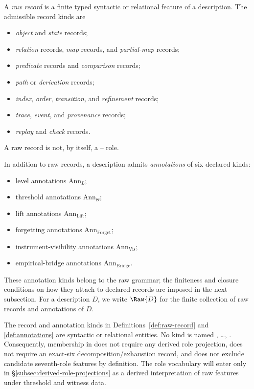 \begin{definition}\label{def:raw-record}
A \emph{raw record} is a finite typed syntactic or relational feature of a
description. The admissible record kinds are
\begin{itemize}[topsep=2pt,itemsep=1pt]
  \item \emph{object} and \emph{state} records;
  \item \emph{relation} records, \emph{map} records, and \emph{partial-map}
    records;
  \item \emph{predicate} records and \emph{comparison} records;
  \item \emph{path} or \emph{derivation} records;
  \item \emph{index}, \emph{order}, \emph{transition}, and \emph{refinement}
    records;
  \item \emph{trace}, \emph{event}, and \emph{provenance} records;
  \item \emph{replay} and \emph{check} records.
\end{itemize}
A raw record is not, by itself, a \Pone{}--\Psix{} role.
\end{definition}

\begin{definition}[Annotations]\label{def:annotations}
In addition to raw records, a description admits \emph{annotations} of six
declared kinds:
\begin{itemize}[topsep=2pt,itemsep=1pt]
  \item level annotations \(\mathrm{Ann}_L\);
  \item threshold annotations \(\mathrm{Ann}_\Theta\);
  \item lift annotations \(\mathrm{Ann}_{\mathrm{Lift}}\);
  \item forgetting annotations \(\mathrm{Ann}_{\mathrm{Forget}}\);
  \item instrument-visibility annotations \(\mathrm{Ann}_{\mathrm{Vis}}\);
  \item empirical-bridge annotations \(\mathrm{Ann}_{\mathrm{Bridge}}\).
\end{itemize}
These annotation kinds belong to the raw grammar; the finiteness and closure
conditions on how they attach to declared records are imposed in the next
subsection. For a description \(D\), we write \(\Raw{D}\) for the finite
collection of raw records and annotations of \(D\).
\end{definition}

\begin{remark}\label{rem:alphabet-independence}
The record and annotation kinds in Definitions~\ref{def:raw-record} and
\ref{def:annotations} are syntactic or relational entities. No kind is named
\Pone{}, \ldots, \Psix{}. Consequently, membership in \FATCD{} does not
require any derived role projection, does not require an exact-six
decomposition/exhaustion record, and does not exclude candidate seventh-role
features by definition. The role vocabulary will enter only in
\S\ref{subsec:derived-role-projections} as a derived interpretation of raw
features under threshold and witness data.
\end{remark}


